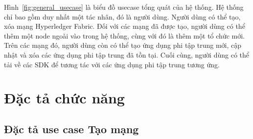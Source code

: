 \documentclass[../DoAn.tex]{subfiles}
\begin{document}
Hình~\ref{fig:general_usecase} là biểu đồ usecase tổng quát của hệ thống. Hệ
thống chỉ bao gồm duy nhất một tác nhân, đó là người dùng. Người dùng có thể
tạo, xóa mạng Hyperledger Fabric. Đối với các mạng đã được tạo, người dùng có
thể thêm một node ngoài vào trong hệ thống, cùng với đó là thêm một tổ chức
mới. Trên các mạng đó, người dùng còn có thể tạo ứng dụng phi tập trung mới,
cập nhật và xóa các ứng dụng phi tập trung đã tồn tại. Cuối cùng, người dùng có
thể tải về các SDK để tương tác với các ứng dụng phi tập trung tương ứng.




\newpage
\section{Đặc tả chức năng}
\label{section:2.3}
\subsection{Đặc tả use case Tạo mạng}
\hfill
\end{document}
